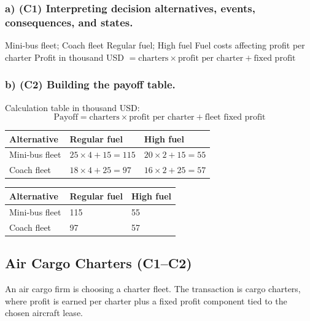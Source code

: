 	\subsubsection*{a) \textbf{(C1)} Interpreting decision alternatives, events, consequences, and states.}
	\label{subsec:problem20-regional-bus-charters-c1}
	\DecisionElementsTable
	{Mini-bus fleet; Coach fleet}
	{Regular fuel; High fuel}
	{Fuel costs affecting profit per charter}
	{Profit in thousand USD $= \text{charters} \times \text{profit per charter} + \text{fixed profit}$}
	
	
	\subsubsection*{b) \textbf{(C2)} Building the payoff table.}
	\label{subsec:problem20-regional-bus-charters-c2}
	Calculation table in thousand USD:
	\[
	\text{Payoff}=\text{charters}\times\text{profit per charter}+\text{fleet fixed profit}
	\]
	\begin{center}
		\begin{tabular}{lll}
			\toprule
			Alternative & Regular fuel & High fuel \\
			\midrule
			Mini-bus fleet & $25 \times 4 + 15 = 115$ & $20 \times 2 + 15 = 55$ \\
			Coach fleet & $18 \times 4 + 25 = 97$ & $16 \times 2 + 25 = 57$ \\
			\bottomrule
		\end{tabular}
	\end{center}
	
	\begin{center}
		\begin{tabular}{lll}
			\toprule
			Alternative & Regular fuel & High fuel \\
			\midrule
			Mini-bus fleet & 115 & 55 \\
			Coach fleet & 97 & 57 \\
			\bottomrule
		\end{tabular}
	\end{center}
	
	
	\subsection{Air Cargo Charters (C1--C2)}
	\label{sec:problem13-air-cargo-charters-c1-c2}
	An air cargo firm is choosing a charter fleet. The transaction is cargo charters, where profit is earned per charter plus a fixed profit component tied to the chosen aircraft lease.
	

